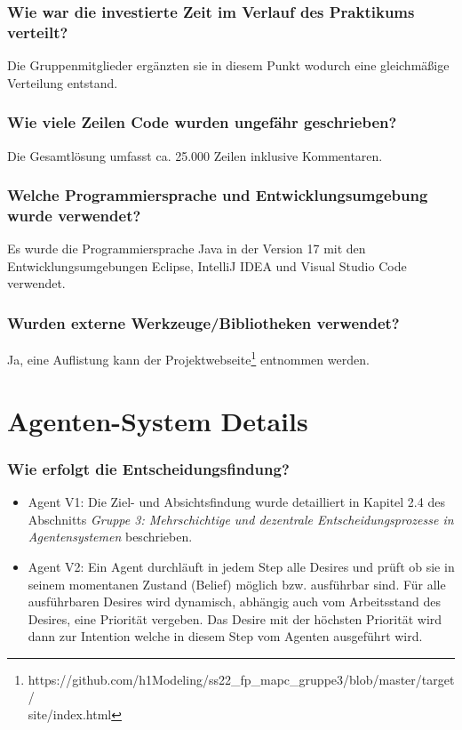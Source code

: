 \documentclass[runningheads]{llncs}
\newcommand{\refMain}{{\textit{Gruppe 3: Mehrschichtige und dezentrale Entscheidungsprozesse in Agentensystemen }}}
\begin{document}
	\subsubsection{Wie war die investierte Zeit im Verlauf des Praktikums verteilt?\\}
	Die Gruppenmitglieder ergänzten sie in diesem Punkt wodurch eine gleichmäßige Verteilung entstand.
	\subsubsection{Wie viele Zeilen Code wurden ungefähr geschrieben?\\}
	Die Gesamtlösung umfasst ca. 25.000 Zeilen inklusive Kommentaren.
	\subsubsection{Welche Programmiersprache und Entwicklungsumgebung wurde verwendet?\\}
	Es wurde die Programmiersprache Java in der Version 17 mit den Entwicklungsumgebungen Eclipse, IntelliJ IDEA und Visual Studio Code verwendet.
	\subsubsection{Wurden externe Werkzeuge/Bibliotheken verwendet?\\}
	Ja, eine Auflistung kann der Projektwebseite\footnote{https://github.com/h1Modeling/ss22\_fp\_mapc\_gruppe3/blob/master/target/ \\site/index.html} entnommen werden.
	\section{Agenten-System Details}
	\subsubsection{Wie erfolgt die Entscheidungsfindung?}
	\begin{itemize}
		\item Agent V1: Die Ziel- und Absichtsfindung wurde detailliert in Kapitel 2.4 des Abschnitts \refMain beschrieben. \\
		\item Agent V2: Ein Agent durchläuft in jedem Step alle Desires und prüft ob sie in seinem momentanen Zustand (Belief) möglich bzw. ausführbar sind. Für alle ausführbaren Desires wird dynamisch, abhängig auch vom Arbeitsstand des Desires, eine Priorität vergeben. Das Desire mit der höchsten Priorität wird dann zur Intention welche in diesem Step vom Agenten ausgeführt wird.
	\end{itemize}
	
\end{document}
